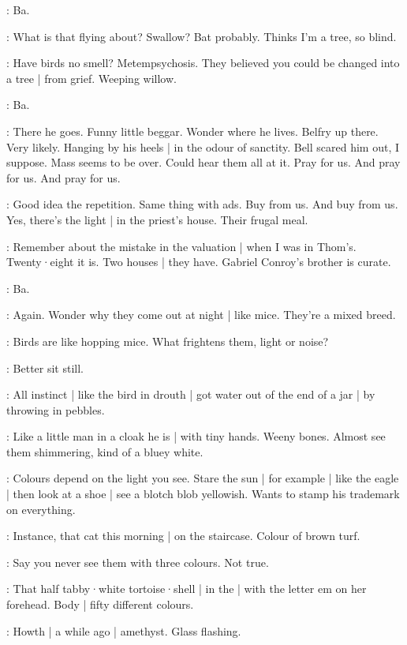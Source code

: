 \bat:
Ba.

\BloomCurrent:
What is that flying about?
Swallow?
Bat probably.
Thinks I'm a tree,
so blind.

\BloomAbstract:
Have birds
no smell?
Metempsychosis.
They believed
you could be changed into a tree |
from grief.
Weeping willow.

\bat:
Ba.

\BloomCurrent:
There he goes.
Funny little beggar.
Wonder where he lives.%
Belfry up there.
Very likely.
Hanging by his heels |
in the odour of sanctity.
Bell scared him out,
I suppose.
Mass seems to be over.
Could hear them all at it.
Pray for us.
And pray for us.
And pray for us.

\BloomAbstract:
Good idea the repetition.
Same thing with ads.
Buy from us.
And buy from us.
Yes,
there's the light |
in the priest's house.
Their frugal meal.

\BloomHist:
Remember about the mistake in the valuation |
when I was in Thom's.
Twenty·eight it is.
Two houses |
they have.
Gabriel Conroy's brother is curate.

\bat:
Ba.

\BloomCurrent:
Again.
Wonder why they come out at night |
like mice.
They're a mixed breed.

\BloomAbstract:
Birds are
like hopping mice.
What frightens them,
light or noise?

\BloomCurrent:
Better sit still.

\BloomAbstract:
All instinct |
like the bird in drouth |
got water out of the end of a jar |
by throwing in pebbles.%

\BloomCurrent:
Like a little man in a cloak he is |
with tiny hands.
Weeny bones.
Almost see them shimmering,
kind of a bluey white.

\BloomAbstract:
Colours depend on the light you see.
Stare the sun |
for example |
like the eagle |
then look at a shoe |
see a blotch blob yellowish.
Wants to stamp his trademark on everything.

\BloomToday:
Instance,
that cat this morning |
on the staircase.
Colour of brown turf.

\BloomAbstract:
Say you never see them with three colours.
Not true.

\BloomHist:
That half tabby·white tortoise·shell |
in the  |
with the letter em on her forehead.
Body |
fifty different colours.

\BloomCurrent:
Howth |
a while ago |
amethyst.
Glass flashing.

